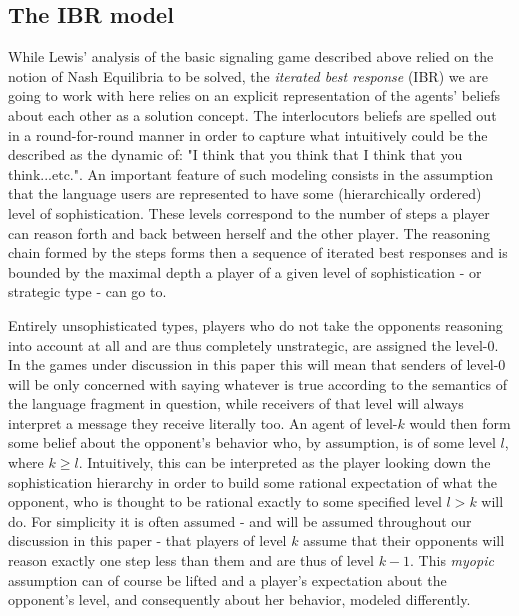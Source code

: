 \documentclass{article}
\begin{document}
\subsection{The IBR model}
While Lewis' analysis of the basic signaling game described above relied on the notion of Nash Equilibria to be solved, the \textit{iterated best response} (IBR) we are going to work with here relies on an explicit representation of the agents' beliefs about each other as a solution concept. The interlocutors beliefs are spelled out in a round-for-round manner in order to capture what intuitively could be the described as the dynamic of: "I think that you think that I think that you think...etc.". An important feature of such modeling consists in the assumption that the language users are represented to have some (hierarchically ordered) level of sophistication. These levels correspond to the number of steps a player can reason forth and back between herself and the other player. The reasoning chain formed by the steps forms then a sequence of iterated best responses and is bounded by the maximal depth a player of a given level of sophistication - or strategic type - can go to. %

Entirely unsophisticated types, players who do not take the opponents reasoning into account at all and are thus completely unstrategic, are assigned the level-0. In the games under discussion in this paper this will mean that senders of level-0 will be only concerned with saying whatever is true according to the semantics of the language fragment in question, while receivers of that level will always interpret a message they receive literally too. An agent of level-$k$ would then form some belief about the opponent's behavior who, by assumption, is of some level $l$, where $k\geq l$. Intuitively, this can be interpreted as the player looking down the sophistication hierarchy in order to build some rational expectation of what the opponent, who is thought to be rational exactly to some specified level $l>k$ will do. For simplicity it is often assumed - and will be assumed throughout our discussion in this paper - that players of level $k$ assume that their opponents will reason exactly one step less than them and are thus of level $k-1$. This \textit{myopic} assumption can of course be lifted and a player's expectation about the opponent's level, and consequently about her behavior, modeled differently.
\end{document}
